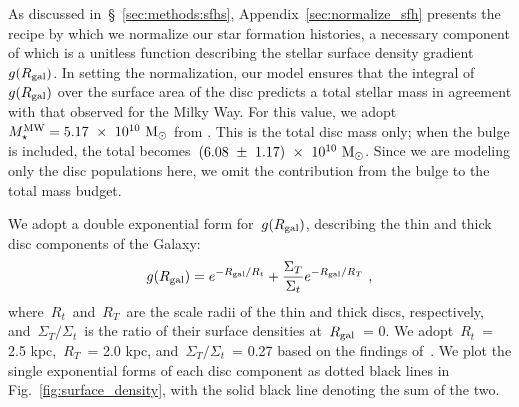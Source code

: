 \documentclass[draft2.tex]{subfiles}
\begin{document}
{\color{red} 
As discussed in~\S~\ref{sec:methods:sfhs}, Appendix~\ref{sec:normalize_sfh} 
presents the recipe by which we normalize our star formation histories, a 
necessary component of which is a unitless function describing the stellar 
surface density gradient~$g(R_\text{gal})$. 
}
In setting the normalization, our model ensures that the integral of~$g(R_\text{gal})$ 
over the surface area of the disc predicts a total stellar mass in agreement 
with that observed for the Milky Way. 
For this value, we adopt~$M_\star^\text{MW} = 5.17~\times~10^{10}~\text{M}_\odot$ from 
\citet[][$\pm 1.11\times10^{10}~\msun$]{Licquia2015}. 
This is the total disc mass only; when the bulge is included, the total 
becomes~$(6.08~\pm~1.17)~\times~10^{10}~\text{M}_\odot$. 
Since we are modeling only the disc populations here, we omit the contribution 
from the bulge to the total mass budget. 
\par 
We adopt a double exponential form for~$g(R_\text{gal})$, describing the thin and 
thick disc components of the Galaxy: 
\begin{equation} 
g(R_\text{gal}) = e^{-R_\text{gal}/R_t} + \frac{\Sigma_T}{\Sigma_t} 
e^{-R_\text{gal}/R_T}~, 
\label{eq:gradient} 
\end{equation} 
where~$R_t$~and~$R_T$~are the scale radii of the thin and thick discs, 
respectively, and~$\Sigma_T/\Sigma_t$~is the ratio of their surface densities 
at~$R_\text{gal}$~= 0. 
We adopt~$R_t$~= 2.5 kpc,~$R_T$~= 2.0 kpc, and~$\Sigma_T/\Sigma_t$~= 0.27 based 
on the findings of~\citet{Bland-Hawthorn2016}. 
We plot the single exponential forms of each disc component as dotted black 
lines in Fig.~\ref{fig:surface_density}, with the solid black line denoting the 
sum of the two. 
\end{document}
